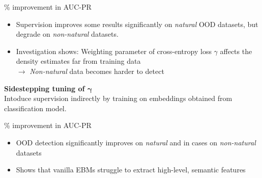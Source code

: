 \documentclass[landscape,a0paper,fontscale=0.292]{baposter}
\begin{document}
\begin{poster}
{\begin{minipage}[t]{0.48\linewidth}
\begin{center}
        \% improvement in AUC-PR
    \end{center}
    \begin{itemize}
        \item Supervision improves some results significantly on \textit{natural} OOD datasets, but degrade on \textit{non-natural} datasets. 
        \item Investigation shows: Weighting parameter of cross-entropy loss \(\gamma \) affects the density estimates far from training data \\
        \(\rightarrow \) \textit{Non-natural} data becomes harder to detect
    \end{itemize}
    \begin{center}
    \end{center}
    \end{minipage}%
    \hfill
    \begin{minipage}[t]{.48\linewidth}
        \textbf{\small \color{blue}Sidestepping tuning of \(\boldsymbol{\gamma} \)}\\
        Intoduce supervision indirectly by training on embeddings obtained from classification model.
        \begin{center}
        \resizebox{0.5\textwidth}{!}{
        
        }
        \vspace{0.5em}

        \% improvement in AUC-PR
        \end{center}
        \begin{itemize}
            \item OOD detection significantly improves on \textit{natural} and in cases on \textit{non-natural} datasets
            \item Shows that vanilla EBMs struggle to extract high-level, semantic features
        \end{itemize}


\end{minipage}}
\end{poster}
\end{document}
